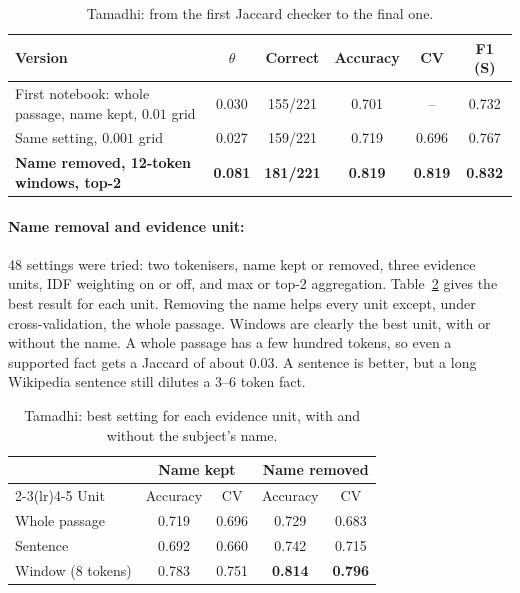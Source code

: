 \documentclass[12pt,a4paper]{article}
\begin{document}
\begin{table}[H]
\centering
\small
\begin{tabular}{lccccc}
\toprule
Version & $\theta$ & Correct & Accuracy & CV & F1 (S) \\
\midrule
First notebook: whole passage, name kept, $0.01$ grid & 0.030 & 155/221 & 0.701 & -- & 0.732 \\
Same setting, $0.001$ grid & 0.027 & 159/221 & 0.719 & 0.696 & 0.767 \\
\textbf{Name removed, 12-token windows, top-2} & \textbf{0.081} & \textbf{181/221} & \textbf{0.819} & \textbf{0.819} & \textbf{0.832} \\
\bottomrule
\end{tabular}
\caption{Tamadhi: from the first Jaccard checker to the final one.}
\label{tab:tam-p1-steps}
\end{table}

\paragraph{Name removal and evidence unit:} 48 settings were tried: two tokenisers, name kept or removed, three evidence units, IDF weighting on or off, and max or top-2 aggregation. Table~\ref{tab:tam-p1-unit} gives the best result for each unit. Removing the name helps every unit except, under cross-validation, the whole passage. Windows are clearly the best unit, with or without the name. A whole passage has a few hundred tokens, so even a supported fact gets a Jaccard of about $0.03$. A sentence is better, but a long Wikipedia sentence still dilutes a 3--6 token fact.

\begin{table}[H]
\centering
\small
\begin{tabular}{lcccc}
\toprule
& \multicolumn{2}{c}{Name kept} & \multicolumn{2}{c}{Name removed} \\
\cmidrule(lr){2-3}\cmidrule(lr){4-5}
Unit & Accuracy & CV & Accuracy & CV \\
\midrule
Whole passage & 0.719 & 0.696 & 0.729 & 0.683 \\
Sentence      & 0.692 & 0.660 & 0.742 & 0.715 \\
Window (8 tokens) & 0.783 & 0.751 & \textbf{0.814} & \textbf{0.796} \\
\bottomrule
\end{tabular}
\caption{Tamadhi: best setting for each evidence unit, with and without the subject's name.}
\label{tab:tam-p1-unit}
\end{table}
\end{document}
